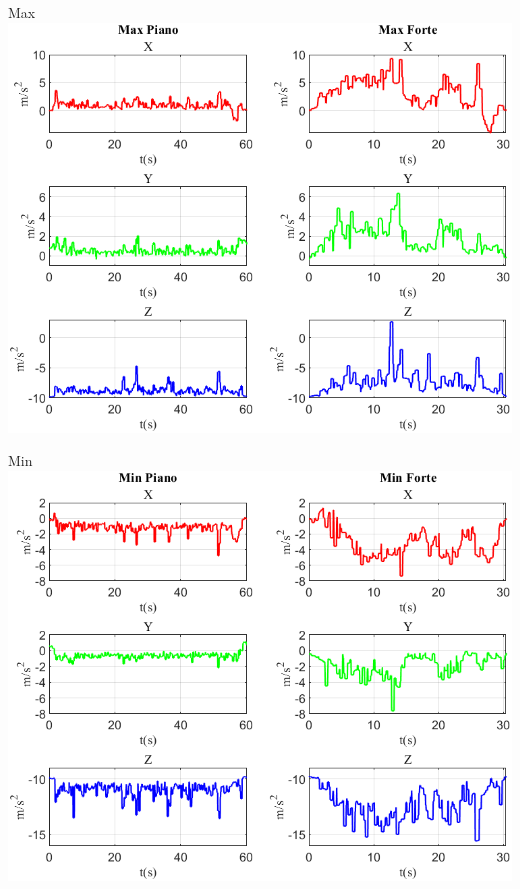 \documentclass[beamer]{standalone}
\begin{document}
	\begin{frame}{{Max}}
		\centering\includegraphics[height=.8\textheight]{figure/Acc/Max}
	\end{frame}
	
		\begin{frame}{{Min}}
				\centering\includegraphics[height=.8\textheight]{figure/Acc/Min}
			\end{frame}
	
\end{document}
